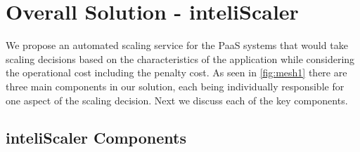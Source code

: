 \section{Overall Solution - inteliScaler}
We propose an automated scaling service for the PaaS systems that would take scaling decisions based on the characteristics of the application while considering the operational cost including the penalty cost. As seen in  \ref{fig:mesh1} there are three main components in our solution, each being individually responsible for one aspect of the scaling decision. Next we discuss each of the key components.

\subsection{inteliScaler Components}